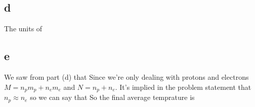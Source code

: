 \subsection*{d}
The units of
\subsection*{e}
We saw from part (d) that
Since we're only dealing with protons and electrons $M=n_pm_p+n_em_e$ and $N=n_p+n_e$. It's implied in the problem statement that $n_p\approx n_e$ so we can say that
So the final average temprature is
